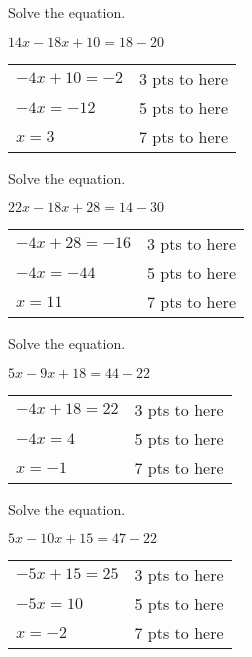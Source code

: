 {
	Solve the equation.
	
	$14x-18x+10=18-20$
}
{
	\begin{tabular}{l r}
	$-4x+10=-2$ & 3 pts to here\\
	$-4x=-12$ & 5 pts to here\\
	$x=3$ & 7 pts to here
	\end{tabular}
}

{
	Solve the equation.
	
	$22x-18x+28=14-30$
}
{
	\begin{tabular}{l r}
	$-4x+28=-16$ & 3 pts to here\\
	$-4x=-44$ & 5 pts to here\\
	$x=11$ & 7 pts to here
	\end{tabular}
}

{
	Solve the equation.
	
	$5x-9x+18=44-22$
}
{
	\begin{tabular}{l r}
	$-4x+18=22$ & 3 pts to here\\
	$-4x=4$ & 5 pts to here\\
	$x=-1$ & 7 pts to here
	\end{tabular}
}

{
	Solve the equation.
	
	$5x-10x+15=47-22$
}
{
	\begin{tabular}{l r}
	$-5x+15=25$ & 3 pts to here\\
	$-5x=10$ & 5 pts to here\\
	$x=-2$ & 7 pts to here
	\end{tabular}
}
